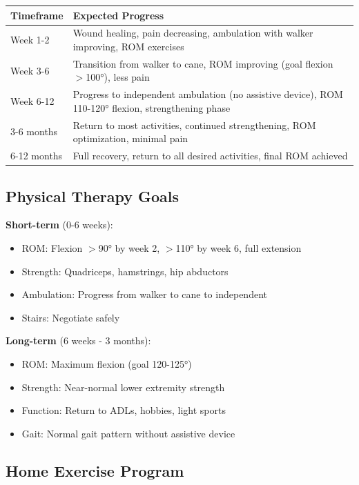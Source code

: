 \documentclass[11pt,letterpaper]{article}
\begin{document}
\begin{tabularx}{\textwidth}{|l|X|}
\hline
\textbf{Timeframe} & \textbf{Expected Progress} \\ \hline
Week 1-2 & Wound healing, pain decreasing, ambulation with walker improving, ROM exercises \\ \hline
Week 3-6 & Transition from walker to cane, ROM improving (goal flexion $>$100°), less pain \\ \hline
Week 6-12 & Progress to independent ambulation (no assistive device), ROM 110-120° flexion, strengthening phase \\ \hline
3-6 months & Return to most activities, continued strengthening, ROM optimization, minimal pain \\ \hline
6-12 months & Full recovery, return to all desired activities, final ROM achieved \\ \hline
\end{tabularx}

\subsection*{Physical Therapy Goals}

\textbf{Short-term} (0-6 weeks):
\begin{itemize}[leftmargin=*]
    \item ROM: Flexion $>$90° by week 2, $>$110° by week 6, full extension
    \item Strength: Quadriceps, hamstrings, hip abductors
    \item Ambulation: Progress from walker to cane to independent
    \item Stairs: Negotiate safely
\end{itemize}

\textbf{Long-term} (6 weeks - 3 months):
\begin{itemize}[leftmargin=*]
    \item ROM: Maximum flexion (goal 120-125°)
    \item Strength: Near-normal lower extremity strength
    \item Function: Return to ADLs, hobbies, light sports
    \item Gait: Normal gait pattern without assistive device
\end{itemize}

\subsection*{Home Exercise Program}
\end{document}
